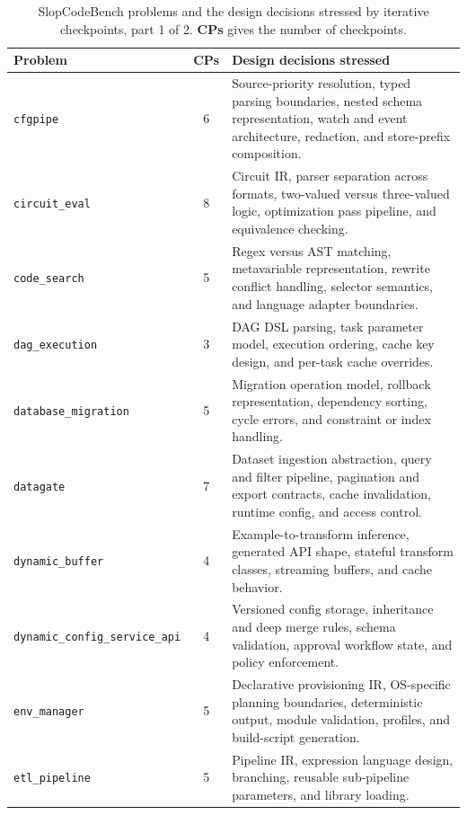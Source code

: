 
\begin{table}[t]
\centering
\caption{SlopCodeBench problems and the design decisions stressed by iterative checkpoints, part 1 of 2. \textbf{CPs} gives the number of checkpoints.}
\label{tab:problem-design-decisions-a}
\scriptsize
\setlength{\tabcolsep}{4pt}
\renewcommand{\arraystretch}{1.08}
\begin{tabularx}{\textwidth}{@{}l c >{\raggedright\arraybackslash}X@{}}
\toprule
Problem & CPs & Design decisions stressed \\
\midrule
\texttt{cfgpipe} & 6 & Source-priority resolution, typed parsing boundaries, nested schema representation, watch and event architecture, redaction, and store-prefix composition. \\
\texttt{circuit\_eval} & 8 & Circuit IR, parser separation across formats, two-valued versus three-valued logic, optimization pass pipeline, and equivalence checking. \\
\texttt{code\_search} & 5 & Regex versus AST matching, metavariable representation, rewrite conflict handling, selector semantics, and language adapter boundaries. \\
\texttt{dag\_execution} & 3 & DAG DSL parsing, task parameter model, execution ordering, cache key design, and per-task cache overrides. \\
\texttt{database\_migration} & 5 & Migration operation model, rollback representation, dependency sorting, cycle errors, and constraint or index handling. \\
\texttt{datagate} & 7 & Dataset ingestion abstraction, query and filter pipeline, pagination and export contracts, cache invalidation, runtime config, and access control. \\
\texttt{dynamic\_buffer} & 4 & Example-to-transform inference, generated API shape, stateful transform classes, streaming buffers, and cache behavior. \\
\texttt{dynamic\_config\_service\_api} & 4 & Versioned config storage, inheritance and deep merge rules, schema validation, approval workflow state, and policy enforcement. \\
\texttt{env\_manager} & 5 & Declarative provisioning IR, OS-specific planning boundaries, deterministic output, module validation, profiles, and build-script generation. \\
\texttt{etl\_pipeline} & 5 & Pipeline IR, expression language design, branching, reusable sub-pipeline parameters, and library loading. \\

\end{tabularx}
\end{table}
